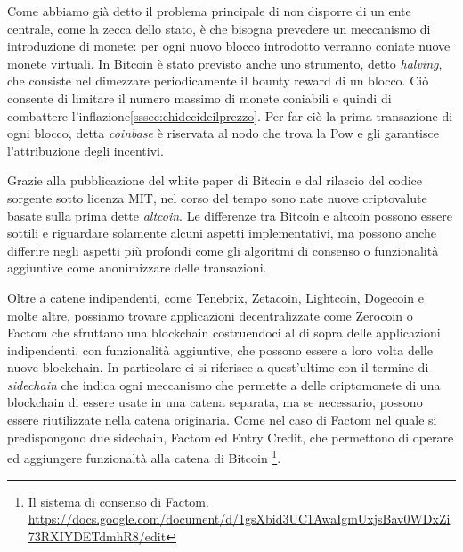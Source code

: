 	Come abbiamo già detto il problema principale di non disporre di un ente centrale, come la zecca dello stato, è che bisogna prevedere un meccanismo di introduzione di monete: per ogni nuovo blocco introdotto verranno coniate nuove monete virtuali.
	In Bitcoin è stato previsto anche uno strumento, detto \textit{halving}, che consiste nel dimezzare periodicamente il bounty reward di un blocco. Ciò consente di limitare il numero massimo di monete coniabili e quindi di combattere l'inflazione\ref{sssec:chidecideilprezzo}.
	Per far ciò la prima transazione di ogni blocco, detta \textit{coinbase} è riservata al nodo che trova la Pow e gli garantisce l'attribuzione degli incentivi.
	
	Grazie alla pubblicazione del white paper di Bitcoin e dal rilascio del codice sorgente sotto licenza MIT, nel corso del tempo sono nate nuove criptovalute basate sulla prima dette \textit{altcoin}. Le differenze tra Bitcoin e altcoin possono essere sottili e riguardare solamente alcuni aspetti implementativi, ma possono anche differire negli aspetti più profondi come gli algoritmi di consenso o funzionalità aggiuntive come anonimizzare delle transazioni.
	
	
	Oltre a catene indipendenti, come Tenebrix, Zetacoin, Lightcoin, Dogecoin e molte altre, possiamo trovare applicazioni decentralizzate come Zerocoin o Factom che sfruttano una blockchain costruendoci al di sopra delle applicazioni indipendenti, con funzionalità aggiuntive, che possono essere a loro volta delle nuove blockchain.
	In particolare ci si riferisce a quest'ultime con il termine di \textit{sidechain} che indica ogni meccanismo che permette a delle criptomonete di una blockchain di essere usate in una catena separata, ma se necessario, possono essere riutilizzate nella catena originaria. Come nel caso di Factom nel quale si predispongono due sidechain, Factom ed Entry Credit, che permettono di operare ed aggiungere funzionaltà alla catena di Bitcoin \footnote{Il sistema di consenso di Factom. \url{https://docs.google.com/document/d/1gsXbid3UC1AwaIgmUxjsBav0WDxZi73RXIYDETdmhR8/edit}}.
	
